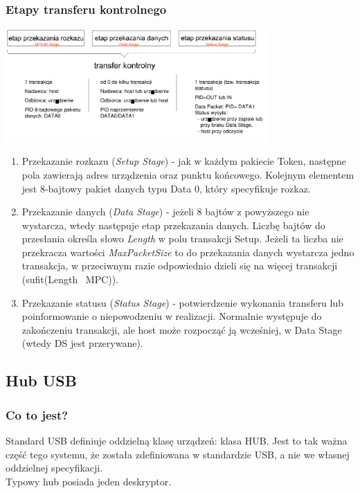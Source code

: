 	\subsubsection{Etapy transferu kontrolnego}
	\includegraphics[width=10cm]{./wyklady/USB_31_1.pdf}
	\begin{enumerate}
		\item Przekazanie rozkazu (\emph{Setup Stage}) - jak w każdym pakiecie Token, następne pola zawierają adres urządzenia oraz punktu końcowego. Kolejnym elementem jest 8-bajtowy pakiet danych typu Data 0, który specyfikuje rozkaz.
		\item Przekazanie danych (\emph{Data Stage}) - jeżeli 8 bajtów z powyższego nie wystarcza, wtedy następuje etap przekazania danych. Liczbę bajtów do przesłania określa słowo \emph{Length} w polu transakcji Setup. Jeżeli ta liczba nie przekracza wartości \emph{MaxPacketSize} to do przekazania danych wystarcza jedno transakcja, w przeciwnym razie odpowiednio dzieli się na więcej transakcji (sufit(Length \ MPC)).
		\item Przekazanie statusu (\emph{Status Stage}) - potwierdzenie wykonania transferu lub poinformowanie o niepowodzeniu w realizacji. Normalnie występuje do zakończeniu transakcji, ale host może rozpocząć ją wcześniej, w Data Stage (wtedy DS jest przerywane).
	\end{enumerate}
	
\subsection{Hub USB}
	\subsubsection{Co to jest?}
	Standard USB definiuje oddzielną klasę urządzeń: klasa HUB. Jest to tak ważna część tego systemu, że została zdefiniowana w standardzie USB, a nie we własnej oddzielnej specyfikacji.\\
	Typowy hub posiada jeden deskryptor.
